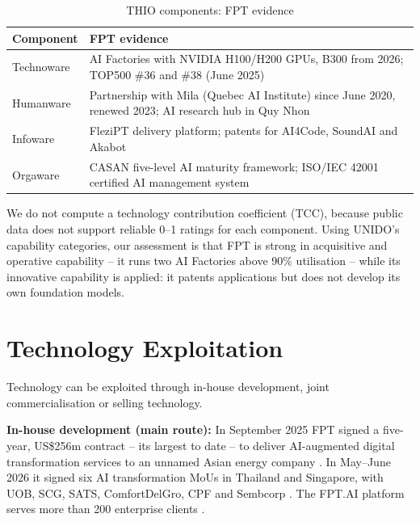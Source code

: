 \documentclass[a4paper,12pt]{report}
\begin{document}
\begin{table}[htbp]
  \centering
  \small
  \caption{THIO components: FPT evidence}
  \label{tab:thio}
  \begin{tabular}{>{\raggedright\arraybackslash}p{2.6cm}>{\raggedright\arraybackslash}p{11.8cm}}
    \toprule
    \textbf{Component} & \textbf{FPT evidence} \\
    \midrule
    Technoware & AI Factories with NVIDIA H100/H200 GPUs, B300 from 2026; TOP500 \#36 and \#38 (June 2025) \cite{S7,S10} \\ \addlinespace
    Humanware & Partnership with Mila (Quebec AI Institute) since June 2020, renewed 2023; AI research hub in Quy Nhon \cite{S15} \\ \addlinespace
    Infoware & FleziPT delivery platform; patents for AI4Code, SoundAI and Akabot \cite{S13,S14,S18} \\ \addlinespace
    Orgaware & CASAN five-level AI maturity framework; ISO/IEC 42001 certified AI management system \cite{S22,S23} \\
    \bottomrule
  \end{tabular}
\end{table}

We do not compute a technology contribution coefficient (TCC), because public data does not support reliable 0--1 ratings for each component. Using UNIDO's capability categories, our assessment is that FPT is strong in acquisitive and operative capability -- it runs two AI Factories above 90\% utilisation -- while its innovative capability is applied: it patents applications but does not develop its own foundation models.



\chapter{Technology Exploitation}

Technology can be exploited through in-house development, joint commercialisation or selling technology.

\textbf{In-house development (main route):} In September 2025 FPT signed a five-year, US\$256m contract -- its largest to date -- to deliver AI-augmented digital transformation services to an unnamed Asian energy company \cite{S24}. In May--June 2026 it signed six AI transformation MoUs in Thailand and Singapore, with UOB, SCG, SATS, ComfortDelGro, CPF and Sembcorp \cite{S25}. The FPT.AI platform serves more than 200 enterprise clients \cite{S26}.
\end{document}

